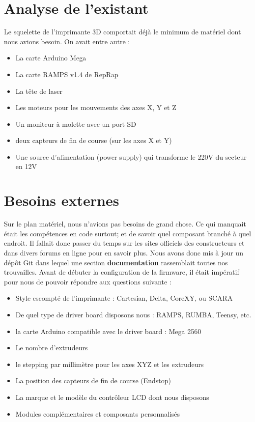\section{Analyse de l'existant}
Le squelette de l'imprimante 3D comportait déjà le minimum de matériel dont nous avions besoin. On avait entre autre :
\begin{itemize}
	\item La carte Arduino Mega
	\item La carte RAMPS v1.4 de RepRap
	\item La tête de laser
	\item Les moteurs pour les mouvements des axes X, Y et Z
	\item Un moniteur à molette avec un port SD
	\item deux capteurs de fin de course (sur les axes X et Y)
	\item Une source d'alimentation (power supply) qui transforme le 220V du secteur en 12V
\end{itemize}

\section{Besoins externes}
Sur le plan matériel, nous n'avions pas besoins de grand chose. Ce qui manquait était les compétences en code surtout; et de savoir quel composant branché à quel endroit. Il fallait donc passer du temps sur les sites officiels des constructeurs et dans divers forums en ligne pour en savoir plus. Nous avons donc mis à jour un dépôt Git dans lequel une section \textbf{documentation} rassemblait toutes nos trouvailles. Avant de débuter la configuration de la firmware, il était impératif pour nous de pouvoir répondre aux questions suivante :
\begin{itemize}
	\item Style escompté de l'imprimante : Cartesian, Delta, CoreXY, ou SCARA
    \item De quel type de driver board disposons nous : RAMPS, RUMBA, Teensy, etc.
    \item la carte Arduino compatible avec le driver board : Mega 2560
    \item Le nombre d'extrudeurs
    \item le stepping par millimètre pour les axes XYZ et les extrudeurs
    \item La position des capteurs de fin de course (Endstop)
	\item La marque et le modèle du contrôleur LCD dont nous disposons
    \item Modules complémentaires et composants personnalisés
\end{itemize}

